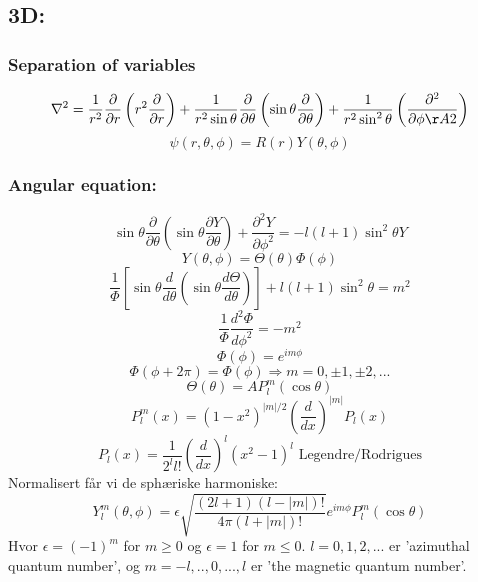 \documentclass[a4paper,norsk, 10pt]{article}
\begin{document}
\subsection{3D:}
\subsubsection{Separation of variables}
\begin{equation}
\nabla^2 = \frac{1}{r^2}\frac{\partial}{\partial r}\left(r^2\frac{\partial}{\partial r}\right) + \frac{1}{r^2\sin\theta}\frac{\partial}{\partial \theta}\left(\sin\theta \frac{\partial}{\partial\theta}\right) + \frac{1}{r^2\sin^2\theta}\left(\frac{\partial^2}{\partial \phiÅ 2}\right)
\end{equation}
\begin{equation}
\psi(r,\theta,\phi) = R(r)Y(\theta,\phi)
\end{equation}
\subsubsection{Angular equation:}
\begin{equation}
\sin\theta\frac{\partial}{\partial \theta}\left(\sin\theta \frac{\partial Y}{\partial \theta}\right) + \frac{\partial^2 Y}{\partial\phi^2} = -l(l+1)\sin^2\theta Y
\end{equation}
\begin{equation}
Y(\theta,\phi) = \Theta(\theta)\Phi(\phi)
\end{equation}
\begin{equation}
\frac{1}{\Phi}\left[\sin\theta\frac{d}{d\theta}\left(\sin\theta\frac{d\Theta}{d\theta}\right)\right] + l(l+1)\sin^2\theta = m^2
\end{equation}
\begin{equation}
\frac{1}{\Phi}\frac{d^2\Phi}{d\phi^2} = -m^2
\end{equation}
\begin{equation}
\Phi(\phi) = e^{im\phi}
\end{equation}
\begin{equation}
\Phi(\phi +2\pi) = \Phi(\phi) \Rightarrow m = 0,\pm 1, \pm 2, ...
\end{equation}
\begin{equation}
\Theta(\theta) = AP_l^m(\cos\theta)
\end{equation}
\begin{equation}
P_l^m(x) = (1-x^2)^{|m|/2}\left(\frac{d}{dx}\right)^{|m|}P_l(x)
\end{equation}
\begin{equation}
P_l(x) = \frac{1}{2^ll!}\left(\frac{d}{dx}\right)^l(x^2-1)^l \text{ Legendre/Rodrigues}
\end{equation}
Normalisert får vi de sphæriske harmoniske:
\begin{equation}
Y^m_l(\theta,\phi) = \epsilon\sqrt{\frac{(2l+1)(l-|m|)!}{4\pi (l+|m|)!}}e^{im\phi}P_l^m(\cos\theta)
\end{equation}
Hvor $\epsilon = (-1)^m$ for $m\geq 0$ og $\epsilon = 1$ for $m\leq 0$. $l = 0,1,2,...$ er 'azimuthal quantum number', og $m = -l,..,0,...,l$ er 'the magnetic quantum number'.
\end{document}
